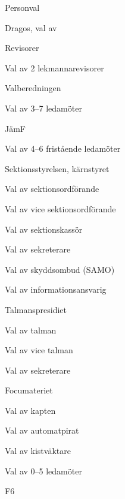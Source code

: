 \documentclass[prelim]{sektionsmote}
\begin{document}

\item{Personval}
\begin{ootd}
    \item Dragos, val av
    \item Revisorer
    \begin{ootd}
        \item Val av 2 lekmannarevisorer
    \end{ootd}
    \item Valberedningen
    \begin{ootd}
        \item Val av 3--7 ledamöter
    \end{ootd}
    \item JämF
    \begin{ootd}
        \item Val av 4--6 fristående ledamöter
    \end{ootd}
    \item Sektionsstyrelsen, kärnstyret
    \begin{ootd}
        \item Val av sektionsordförande
        \item Val av vice sektionsordförande
        \item Val av sektionskassör
        \item Val av sekreterare
        \item Val av skyddsombud (SAMO)
        \item Val av informationsansvarig
    \end{ootd}
    \item Talmanspresidiet
    \begin{ootd}
        \item Val av talman
        \item Val av vice talman
        \item Val av sekreterare
    \end{ootd}
    \item Focumateriet
    \begin{ootd}
        \item Val av kapten
        \item Val av automatpirat
        \item Val av kistväktare
        \item Val av 0--5 ledamöter
    \end{ootd}
    \item F6

\end{ootd}
\end{document}
